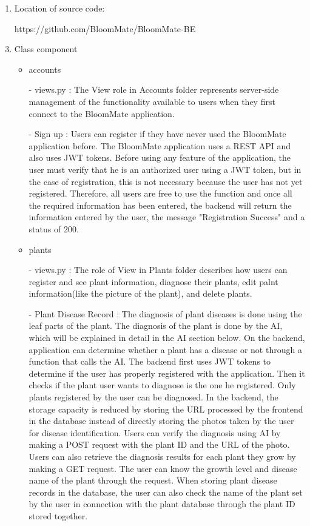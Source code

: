 \documentclass[conference, a4paper]{IEEEtran}
\begin{document}
\begin{enumerate}
    \item Location of source code:
    \item[] https://github.com/BloomMate/BloomMate-BE\\
    \item Class component
    \begin{itemize}
        \item accounts
        \item[-] views.py : The View role in Accounts folder represents server-side management of the functionality available to users when they first connect to the BloomMate application.
        \item [-] Sign up : Users can register if they have never used the BloomMate application before. The BloomMate application uses a REST API and also uses JWT tokens. Before using any feature of the application, the user must verify that he is an authorized user using a JWT token, but in the case of registration, this is not necessary because the user has not yet registered. Therefore, all users are free to use the function and once all the required information has been entered, the backend will return the information entered by the user, the message "Registration Success" and a status of 200.\\
        \item plants
        \item[-] views.py : The role of View in Plants folder describes how users can register and see plant information, diagnose their plants, edit palnt information(like the picture of the plant), and delete plants.
        \item[-] Plant Disease Record : The diagnosis of plant diseases is done using the leaf parts of the plant. The diagnosis of the plant is done by the AI, which will be explained in detail in the AI section below. On the backend, application can determine whether a plant has a disease or not through a function that calls the AI. The backend first uses JWT tokens to determine if the user has properly registered with the application. Then it checks if the plant user wants to diagnose is the one he registered. Only plants registered by the user can be diagnosed. In the backend, the storage capacity is reduced by storing the URL processed by the frontend in the database instead of directly storing the photos taken by the user for disease identification. Users can verify the diagnosis using AI by making a POST request with the plant ID and the URL of the photo. Users can also retrieve the diagnosis results for each plant they grow by making a GET request. The user can know the growth level and disease name of the plant through the request. When storing plant disease records in the database, the user can also check the name of the plant set by the user in connection with the plant database through the plant ID stored together.\\

\end{itemize}
\end{enumerate}
\end{document}
